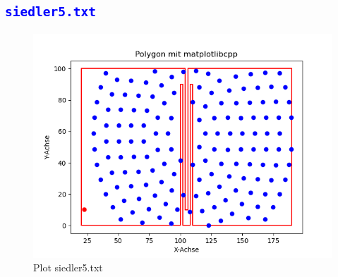 \documentclass{article}
\begin{document}
\subsection{\textcolor{blue}{\texttt{siedler5.txt}}}
\begin{figure}[H]
    \centering
    \includegraphics[width=1\textwidth]{Bilder/Figure_5.png}
    \caption{Plot siedler5.txt}
\end{figure}
\end{document}
